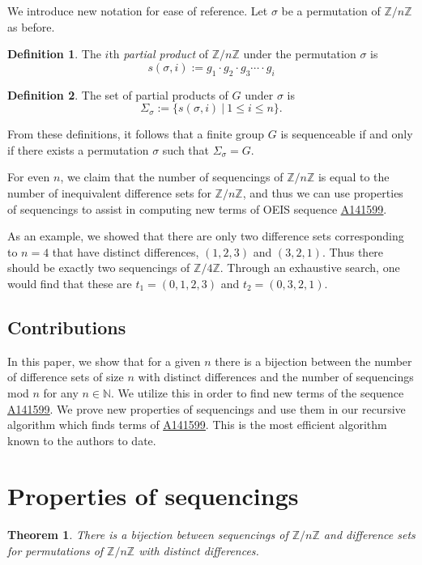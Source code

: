 \documentclass[12pt]{article}
\theoremstyle{plain}
\newtheorem{theorem}{Theorem}
\theoremstyle{definition}
\newtheorem{definition}{Definition}
\theoremstyle{remark}
\newcommand{\ZZ}{\mathbb{Z}}
\newcommand{\partialsum}[2]{s(#1,#2)}
\newcommand{\partialsumset}[1]{\Sigma_{#1}}
\newcommand{\seqnum}[1]{\href{https://oeis.org/#1}{\textrm \underline{#1}}}
\begin{document}
We introduce new notation for ease of reference. Let $\sigma$ be a permutation of $\ZZ/n\ZZ$ as before.
\begin{definition}
The $i$th \textit{partial product} of $\ZZ/n\ZZ$ under the permutation $\sigma$ is $$\partialsum{\sigma}{i} := g_1\cdot g_2\cdot g_3\cdots\cdot g_i$$
\end{definition}

\begin{definition}
The set of partial products of $G$ under $\sigma$ is $$\partialsumset{\sigma}:=\{\partialsum{\sigma}{i}\ |\ 1\leq i \leq n\}.$$ 
\end{definition}

 From these definitions, it follows that a finite group $G$ is sequenceable if and only if there exists a permutation $\sigma$ such that $\partialsumset{\sigma} = G$.

For even $n$, we claim that the number of sequencings of $\ZZ/n\ZZ$ is equal to the number of inequivalent difference sets for $\ZZ/n\ZZ$, and thus we can use properties of sequencings to assist in computing new terms of OEIS sequence \seqnum{A141599}.

As an example, we showed that there are only two difference sets corresponding to $n=4$ that have distinct differences,  $(1,2,3)$ and $(3, 2, 1)$. Thus there should be exactly two sequencings of $\ZZ / 4\ZZ$. Through an exhaustive search, one would find that these are $t_1 = (0, 1, 2, 3)$ and $t_2 = (0, 3, 2, 1)$. 

\subsection{Contributions}

In this paper, we show that for a given $n$ there is a bijection between the number of difference sets of size $n$ with distinct differences and the number of sequencings mod $n$ for any $n\in\mathbb{N}$. We utilize this in order to find new terms of the sequence \seqnum{A141599}. We prove new properties of sequencings and use them in our recursive algorithm which finds terms of \seqnum{A141599}. This is the most efficient algorithm known to the authors to date.

\section{Properties of sequencings}

\begin{theorem}
There is a bijection between sequencings of $\ZZ/n\ZZ$ and difference sets for permutations of $\ZZ/n\ZZ$ with distinct differences.
\end{theorem}
\end{document}

